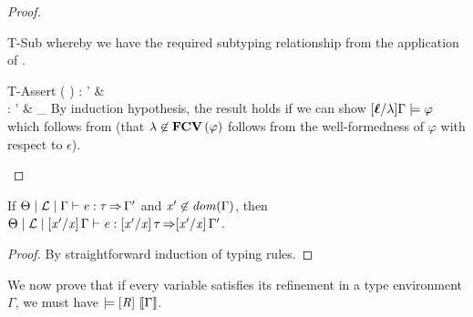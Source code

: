 \begin{proof}
\begin{enumerate}
\begin{rneqncase}{T-Sub}
      whereby we have the required subtyping relationship from the application of .
    \end{rneqncase}
    \begin{rneqncase}{T-Assert}{
         \Theta   \mid   \lambda   \mid   \Gamma   \vdash    \ASSERT( \varphi ) \SEQ  {}   :  \tau   \produces   \Gamma'  & \Gamma  \models  \varphi \\
         \Theta   \mid   \lambda   \mid   \Gamma   \vdash   {}  :  \tau   \produces   \Gamma'  &   \epsilon    \mid   \Gamma   \vdash _{\wf}  \varphi 
      }
      By induction hypothesis, the result holds if we can show $\ottsym{[}  \oldvec{\ell}  \ottsym{/}  \lambda  \ottsym{]}  \Gamma  \models  \varphi$ which
      follows from  (that $ \lambda  \not\in  \mathbf{FCV} \, (  \varphi  ) $ follows
      from the well-formedness of $\varphi$ with respect to $ \epsilon $).
    \end{rneqncase}
  \end{enumerate}
\end{proof}


\begin{lemma}[Substitution] %
  \label{lem:substitution}
  If $ \Theta   \mid   \mathcal{L}   \mid   \Gamma   \vdash   \mathit{e}  :  \tau   \operatorname{\Rightarrow}   \Gamma' $ and $ \mathit{x'}  \not\in \mathit{dom}( \Gamma ) $, then
  $ \Theta   \mid   \mathcal{L}   \mid    [  \mathit{x'}  /  \mathit{x}  ]  \, \Gamma   \vdash   \mathit{e}  :   [  \mathit{x'}  /  \mathit{x}  ]  \, \tau   \operatorname{\Rightarrow}    [  \mathit{x'}  /  \mathit{x}  ]  \, \Gamma' $.
\end{lemma}
\begin{proof}
  By straightforward induction of typing rules.
\end{proof}

We now prove that if every variable satisfies its refinement in a type environment $\Gamma$,
we must have $\models  [  \mathit{R}  ] \,  \left\llbracket{ \Gamma }\right\rrbracket $.

